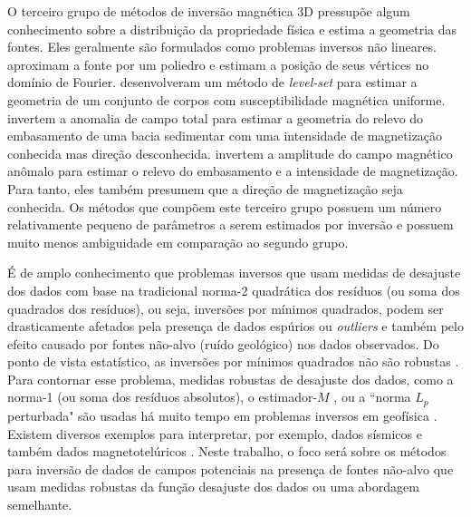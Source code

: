 O terceiro grupo de métodos de inversão magnética 3D pressupõe algum conhecimento sobre a distribuição da propriedade física e estima a geometria das fontes.
Eles geralmente são formulados como problemas inversos não lineares. \cite{wang_inversion_1990} aproximam a fonte por um poliedro e estimam a posição de seus vértices no domínio de Fourier. 
\cite{wenbin-2017} desenvolveram um método de \textit{level-set} para estimar a geometria de um conjunto de corpos com susceptibilidade magnética uniforme. 
\cite{hidalgo-2019} invertem a anomalia de campo total para estimar a geometria do relevo do embasamento de uma bacia sedimentar com uma intensidade de magnetização conhecida mas direção desconhecida. 
\cite{hidalgo-2020} invertem a amplitude do campo magnético anômalo para estimar o relevo do embasamento e a intensidade de magnetização.
Para tanto, eles também presumem que a direção de magnetização seja conhecida. Os métodos que compõem este terceiro grupo possuem um número relativamente pequeno de parâmetros a serem estimados por inversão e possuem muito menos ambiguidade em comparação ao segundo grupo.

É de amplo conhecimento que problemas inversos que usam medidas de desajuste dos dados com base na tradicional norma-2 quadrática dos resíduos (ou soma dos quadrados dos resíduos), ou seja, inversões por mínimos quadrados, podem ser drasticamente afetados pela presença de dados espúrios ou \textit{outliers} e também pelo efeito causado por fontes não-alvo (ruído geológico) nos dados observados.
Do ponto de vista estatístico, as inversões por mínimos quadrados não são robustas \citep{huber1964, scales_gersztenkorn1988}.
Para contornar esse problema, medidas robustas de desajuste dos dados, como a norma-1 (ou soma dos resíduos absolutos), o estimador-$ M $ \citep{huber1964}, ou a ``norma $ L_ {p} $ perturbada" \citep{ekblom1973} são usadas há muito tempo em problemas inversos em geofísica \citep{farquharson_oldenburg1998}.
Existem diversos exemplos para interpretar, por exemplo, dados sísmicos \citep[por exemplo,][]{claerbout_muir1973, scales_gersztenkorn1988, crase_etal1990, amundsen1991, guitton_symes2003, ji2012, dasilva2020} e também dados magnetotelúricos \citep[por exemplo,][]{egbert_booker1986, chave_etal1987, sutarno_vozoff1991, larsen_etal1996, matsuno_etal2014}.
Neste trabalho, o foco será sobre os métodos para inversão de dados de campos potenciais na presença de fontes não-alvo que usam medidas robustas da função desajuste dos dados ou uma abordagem semelhante.

